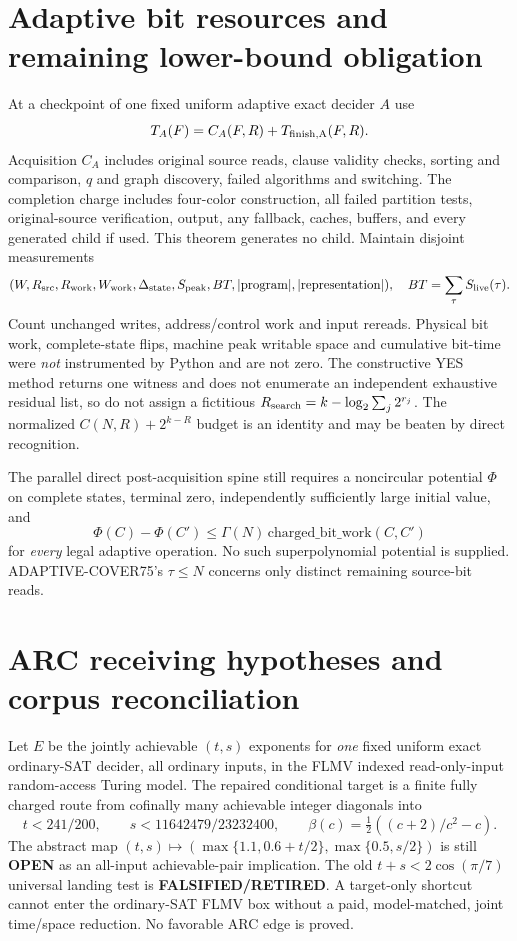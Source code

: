 \documentclass[11pt]{article}
\begin{document}
\section{Adaptive bit resources and remaining lower-bound obligation}
At a checkpoint of one fixed uniform
adaptive exact decider $A$ use
\[
 T_A(F)=C_A(F,R)+T_{\rm finish,A}(F,R).
\]
Acquisition $C_A$ includes original
source reads, clause validity checks,
sorting and comparison, $q$ and
graph discovery, failed algorithms
and switching. The completion charge
includes four-color construction,
all failed partition tests,
original-source verification, output,
any fallback, caches, buffers,
and every generated child if used.
This theorem generates no child.
Maintain disjoint measurements
\[
 (W,R_{\rm src},R_{\rm work},W_{\rm work},
 \Delta_{\rm state},S_{\rm peak},BT,
 |{\rm program}|,|{\rm representation}|),
 \quad BT=\sum_{\tau}S_{\rm live}(\tau).
\]
Count unchanged writes, address/control
work and input rereads. Physical bit
work, complete-state flips, machine
peak writable space and cumulative
bit-time were \emph{not} instrumented
by Python and are not zero.
The constructive YES method returns
one witness and does not enumerate
an independent exhaustive residual
list, so do not assign a fictitious
$R_{\rm search}=k-\log_2\sum_j2^{r_j}$.
The normalized $C(N,R)+2^{k-R}$
budget is an identity and may be
beaten by direct recognition.

The parallel direct post-acquisition
spine still requires a noncircular
potential $\Phi$ on complete states,
terminal zero, independently
sufficiently large initial value, and
\[
 \Phi(C)-\Phi(C')\le\Gamma(N)
 \,\mathrm{charged\_bit\_work}(C,C')
\]
for \emph{every} legal adaptive operation.
No such superpolynomial potential
is supplied. ADAPTIVE-COVER75's
$\tau\le N$ concerns only distinct
remaining source-bit reads.

\section{ARC receiving hypotheses and corpus reconciliation}
Let $E$ be the jointly achievable
$(t,s)$ exponents for \emph{one}
fixed uniform exact ordinary-SAT
decider, all ordinary inputs, in the
FLMV indexed read-only-input
random-access Turing model.
The repaired conditional target is
a finite fully charged route from
cofinally many achievable integer
diagonals into
\[
 t<241/200,\qquad
 s<11642479/23232400,\qquad
 \beta(c)=\tfrac12((c+2)/c^2-c).
\]
The abstract map
$(t,s)\mapsto(\max\{1.1,0.6+t/2\},
\max\{0.5,s/2\})$ is still
\textbf{OPEN} as an all-input
achievable-pair implication.
The old $t+s<2\cos(\pi/7)$
universal landing test is
\textbf{FALSIFIED/RETIRED}.
A target-only shortcut cannot
enter the ordinary-SAT FLMV box
without a paid, model-matched,
joint time/space reduction.
No favorable ARC edge is proved.
\end{document}

